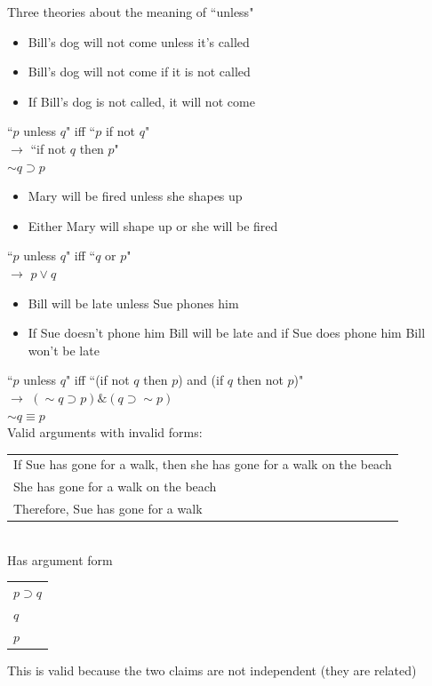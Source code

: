 \documentclass[11pt, fleqn]{article}
\begin{document}
Three theories about the meaning of ``unless"
\begin{itemize}
    \item Bill's dog will not come unless it's called
    \item Bill's dog will not come if it is not called
    \item If Bill's dog is not called, it will not come
\end{itemize}
``$p$ unless $q$" iff ``$p$ if not $q$"\\
$\to$ ``if not $q$ then $p$"\\
$\sim q \supset p$\\

\begin{itemize}
    \item Mary will be fired unless she shapes up
    \item Either Mary will shape up or she will be fired
\end{itemize}
``$p$ unless $q$" iff ``$q$ or $p$"\\
$\to$ $p\vee q$\\

\begin{itemize}
    \item Bill will be late unless Sue phones him
    \item If Sue doesn't phone him Bill will be late and if Sue does phone him Bill won't be late
\end{itemize}
``$p$ unless $q$" iff ``(if not $q$ then $p$) and (if $q$ then not $p$)"\\
$\to$ $(\sim q\supset p)\&(q\supset\sim p)$\\
$\sim q\equiv p$\\

Valid arguments with invalid forms:\\
\begin{tabular}{p{12cm}}
    If Sue has gone for a walk, then she has gone for a walk on the beach\\
    She has gone for a walk on the beach\\
    \hline
    Therefore, Sue has gone for a walk
\end{tabular}\\
Has argument form\\
\begin{tabular}{p{2cm}}
    $p\supset q$\\
    $q$\\
    \hline
    $p$
\end{tabular}
This is valid because the two claims are not independent (they are related)\\
\end{document}
